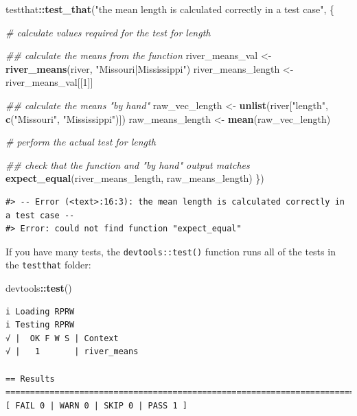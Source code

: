 \documentclass[
]{book}
\newenvironment{Shaded}{\begin{snugshade}}{\end{snugshade}}
\newcommand{\CommentTok}[1]{\textcolor[rgb]{0.56,0.35,0.01}{\textit{#1}}}
\newcommand{\DecValTok}[1]{\textcolor[rgb]{0.00,0.00,0.81}{#1}}
\newcommand{\KeywordTok}[1]{\textcolor[rgb]{0.13,0.29,0.53}{\textbf{#1}}}
\newcommand{\NormalTok}[1]{#1}
\newcommand{\OperatorTok}[1]{\textcolor[rgb]{0.81,0.36,0.00}{\textbf{#1}}}
\newcommand{\StringTok}[1]{\textcolor[rgb]{0.31,0.60,0.02}{#1}}
\begin{document}
\begin{Shaded}
\begin{Highlighting}[]
\NormalTok{testthat}\OperatorTok{::}\KeywordTok{test_that}\NormalTok{(}\StringTok{"the mean length is calculated correctly in a test case"}\NormalTok{, \{}
  
  \CommentTok{# calculate values required for the test for length}

  \CommentTok{## calculate the means from the function}
\NormalTok{  river_means_val <-}\StringTok{ }\KeywordTok{river_means}\NormalTok{(river, }\StringTok{"Missouri|Mississippi"}\NormalTok{)}
\NormalTok{  river_means_length <-}\StringTok{ }\NormalTok{river_means_val[[}\DecValTok{1}\NormalTok{]]}

  \CommentTok{## calculate the means "by hand"}
\NormalTok{  raw_vec_length <-}\StringTok{ }\KeywordTok{unlist}\NormalTok{(river[}\StringTok{"length"}\NormalTok{, }\KeywordTok{c}\NormalTok{(}\StringTok{"Missouri"}\NormalTok{, }\StringTok{"Mississippi"}\NormalTok{)])}
\NormalTok{  raw_means_length <-}\StringTok{ }\KeywordTok{mean}\NormalTok{(raw_vec_length)}
  
  \CommentTok{# perform the actual test for length}

  \CommentTok{## check that the function and "by hand" output matches}
  \KeywordTok{expect_equal}\NormalTok{(river_means_length, raw_means_length)}
\NormalTok{\})}
\end{Highlighting}
\end{Shaded}

\begin{verbatim}
#> -- Error (<text>:16:3): the mean length is calculated correctly in a test case --
#> Error: could not find function "expect_equal"
\end{verbatim}

If you have many tests, the \texttt{devtools::test()} function runs all of the tests in the \texttt{testthat} folder:

\begin{Shaded}
\begin{Highlighting}[]
\NormalTok{devtools}\OperatorTok{::}\KeywordTok{test}\NormalTok{()}
\end{Highlighting}
\end{Shaded}

\begin{verbatim}
i Loading RPRW
i Testing RPRW
√ |  OK F W S | Context
√ |   1       | river_means                                                     
                                               
== Results =========================================================================
[ FAIL 0 | WARN 0 | SKIP 0 | PASS 1 ]
\end{verbatim}
\end{document}
